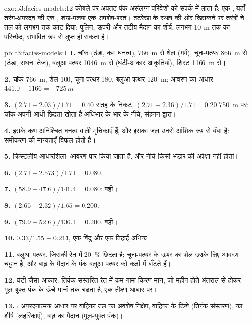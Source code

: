 \begin{solution}{exo:b3:facies-models:12}
कोयले पर अपतट पंक असंलग्न परिवेशों को संपर्क में लाता है:
एक , यहाँ तरंग-अपरदन की एक , शंख-मलबा
एक अवशेष-परत। तटरेखा के स्थल की ओर खिसकने पर तरंगों ने तल को
लगभग  तक काट दिया: पुलिन, ऊपरी  और
तटीय मैदान का शीर्ष, लगभग \qty{10}{m} तक का परिच्छेद, संभावित रूप से
लुप्त हो सकता है।
\end{solution}

\begin{solution}{pb:b3:facies-models:1}
\textbf{1.} चॉक (ठंडा, कम घनत्व), \qty{766}{m} से शेल (गर्म), चूना-पत्थर
\qty{866}{m} से (ठंडा, सघन, तेज़), बलुआ पत्थर \qty{1046}{m} से (घंटी-आकार
आकृतियाँ), शिस्ट \qty{1166}{m} से।

\textbf{2.} चॉक \qty{766}{m}, शेल 100, चूना-पत्थर 180, बलुआ पत्थर
\qty{120}{m}; आवरण का आधार $441.0 - 1166 = \qty{-725}{m}$।

\textbf{3.} $(2.71 - 2.03)/1.71 = 0.40$ सतह के निकट, $(2.71 -
2.36)/1.71 = 0.20$ \qty{750}{m} पर: चॉक अपनी आधी छिद्रता खोता है
अधिभार के भार के नीचे, संहनन द्वारा।

\textbf{4.} इसके कण अनिश्चित घनत्व वाली मृत्तिकाएँ हैं, और इसका जल
उनसे आंशिक रूप से बँधा है: समीकरण की मान्यताएँ विफल होती हैं।

\textbf{5.} क्रिस्टलीय आधारशिला: आवरण पार किया जाता है, और
नीचे किसी भंडार की अपेक्षा नहीं होती।

\textbf{6.} $(2.71 - 2.573)/1.71 = 0.080$.

\textbf{7.} $(58.9 - 47.6)/141.4 = 0.080$: वही।

\textbf{8.} $(2.65 - 2.32)/1.65 = 0.200$.

\textbf{9.} $(79.9 - 52.6)/136.4 = 0.200$: वही।

\textbf{10.} $0.33/1.55 = 0.213$, एक बिंदु और एक-तिहाई अधिक।

\textbf{11.} बलुआ पत्थर, जिसकी रेत में \qty{20}{\percent} छिद्रता है;
चूना-पत्थर के ऊपर का शेल उसके लिए आवरण चट्टान है, और बाढ़ के मैदान के पंक बलुआ पत्थर को
कक्षों में बाँटते हैं।

\textbf{12.} घंटी जैसा आकार: तिर्यक संस्तरित रेत में कम गामा-किरण मान, जो
महीन होते अंतराल से होकर मूल-युक्त पंक के ऊँचे मानों तक चढ़ता है, एक तीक्ष्ण आधार पर।

\textbf{13.} : अपरदनात्मक आधार पर वाहिका-तल का अवशेष-निक्षेप,
वाहिका के टिब्बे (तिर्यक संस्तरण),  का शीर्ष (लहरिकाएँ), बाढ़ का मैदान
(मूल-युक्त पंक)।


\end{solution}
